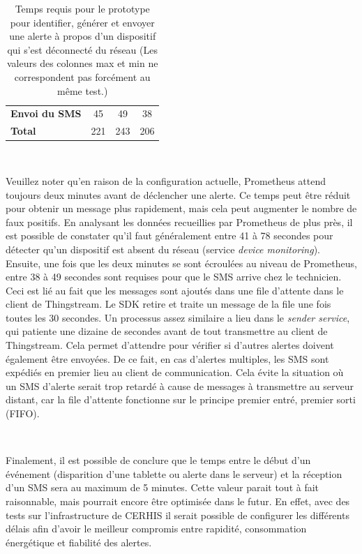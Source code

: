 \begin{table}[ht!]
\begin{tabular}{@{}lccc@{}}
\vspace{0.1cm}
\textbf{Envoi du SMS}                                                             & 45                                                                  & 49                                                               & 38                                                               \\
\vspace{0.1cm}
\textbf{Total}                                                                    & 221                                                                 & 243                                                              & 206                                                              \\ \bottomrule
\end{tabular}%
\caption{Temps requis pour le prototype pour identifier, générer et envoyer une alerte à propos d'un dispositif qui s'est déconnecté du réseau (Les valeurs des colonnes max et min ne correspondent pas forcément au même test.)}
\label{tab:end_delays}
\end{table}

~

\noindent
Veuillez noter qu'en raison de la configuration actuelle, Prometheus attend toujours deux minutes avant de déclencher une alerte. Ce temps peut être réduit pour obtenir un message plus rapidement, mais cela peut augmenter le nombre de faux positifs. En analysant les données recueillies par Prometheus de plus près, il est possible de constater qu'il faut généralement entre 41 à 78 secondes pour détecter qu'un dispositif est absent du réseau (service \textit{device monitoring}). Ensuite, une fois que les deux minutes se sont écroulées au niveau de Prometheus, entre 38 à 49 secondes sont requises pour que le SMS arrive chez le technicien. Ceci est lié au fait que les messages sont ajoutés dans une file d'attente dans le client de Thingstream. Le SDK retire et traite un message de la file une fois toutes les 30 secondes. Un processus assez similaire a lieu dans le \textit{sender service}, qui patiente une dizaine de secondes avant de tout transmettre au client de Thingstream. Cela permet d'attendre pour vérifier si d'autres alertes doivent également être envoyées. De ce fait, en cas d'alertes multiples, les SMS sont expédiés en premier lieu au client de communication. Cela évite la situation où un SMS d'alerte serait trop retardé à cause de messages à transmettre au serveur distant, car la file d'attente fonctionne sur le principe premier entré, premier sorti (FIFO).

~

\noindent
Finalement, il est possible de conclure que le temps entre le début d'un événement (disparition d'une tablette ou alerte dans le serveur) et la réception d'un SMS sera au maximum de 5 minutes. Cette valeur parait tout à fait raisonnable, mais pourrait encore être optimisée dans le futur. En effet, avec des tests sur l'infrastructure de CERHIS il serait possible de configurer les différents délais afin d'avoir le meilleur compromis entre rapidité, consommation énergétique et fiabilité des alertes.
